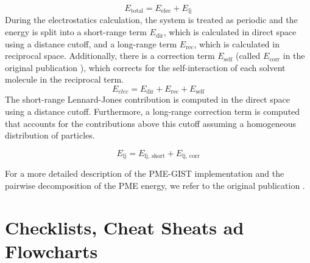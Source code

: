 \documentclass[9pt,tutorial]{livecoms}
\begin{document}
\begin{equation}
	E_\text{total} = E_\text{elec} + E_\text{lj}
\end{equation}
During the electrostatics calculation, the system is treated as periodic and the energy is split into a short-range term $E_\text{dir}$, which is calculated in direct space using a distance cutoff, and a long-range term $E_\text{rec}$, which is calculated in reciprocal space.
Additionally, there is a correction term $E_\text{self}$ (called $E_\text{corr}$ in the original publication \cite{Chen2021}), which corrects for the self-interaction of each solvent molecule in the reciprocal term.
\begin{equation}
	E_\textit{elec} = E_\text{dir} + E_\text{rec} + E_\text{self}
\end{equation}
The short-range Lennard-Jones contribution is computed in the direct space using a distance cutoff.
Furthermore, a long-range correction term is computed that accounts for the contributions above this cutoff assuming a homogeneous distribution of particles.

\begin{equation}
	E_\text{lj} = E_\text{lj,\ short} +  E_\text{lj,\ corr}
\end{equation}

For a more detailed description of the PME-GIST implementation and the pairwise decomposition of the PME energy, we refer to the original publication \cite{Chen2021}.
\section{Checklists, Cheat Sheats ad Flowcharts} \label{sec:checklists}
\end{document}

